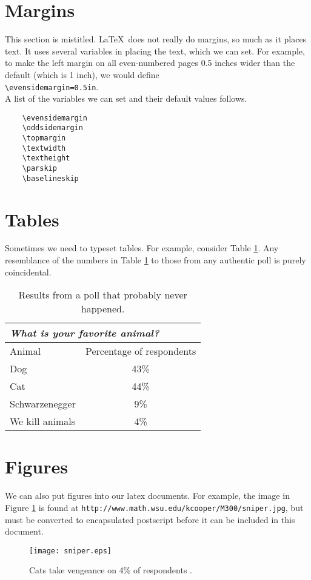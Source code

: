 \documentclass[12pt]{article}
\begin{document}
\section{Margins}
This section is mistitled.
\LaTeX\ does not really do margins,
so much as it places text.
It uses several variables in placing the
text, which we can set.
For example, to make the left margin on
all even-numbered pages 0.5 inches wider than the default (which is 
1 inch), we would define\\
\verb(\evensidemargin=0.5in(.\\
A list of the variables we can set and their default values follows.
\begin{verbatim}
    \evensidemargin
    \oddsidemargin
    \topmargin
    \textwidth
    \textheight
    \parskip
    \baselineskip
\end{verbatim}

\section{Tables}
Sometimes we need to typeset tables.
For example, 
consider Table \ref{animaltable}.  
Any resemblance of the numbers in 
Table \ref{animaltable} to those from any authentic poll is purely coincidental.
\begin{table}
    \begin{center}
        \caption{\label{animaltable}
        Results from a poll that probably never happened.}
        \begin{tabular}{||l|c||}
            \hline
            \cline{1-2}
            \multicolumn{2}{||l||}{{\it What is your favorite animal?}}\\
            \hline
            Animal & Percentage of respondents\\
            \hline
            Dog & 43\%\\
            Cat & 44\%\\
            Schwarzenegger & 9\%\\
            We kill animals & 4\%\\
            \hline
            \hline
        \end{tabular}
    \end{center}
\end{table}

\section{Figures}
We can also put figures into our latex documents.
For example, the
image in Figure \ref{sniper} is found at 
{\tt http://www.math.wsu.edu/kcooper/M300/sniper.jpg}, but must
be converted to encapsulated postscript before it can be included
in this document.
\begin{figure}[ht]
    \begin{center}
        \texttt{[image: sniper.eps]}
        \caption{\label{sniper}
        Cats take vengeance on 4\% of respondents \cite{calvin}.}
        \vfill
    \end{center}
\end{figure}
\end{document}
